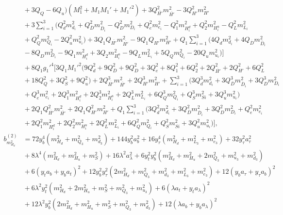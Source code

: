 \documentclass[preprint,amsmath,amssymb,aps,superscriptaddress,prd,showpacs,floatfix,nofootinbib]{revtex4-1}
\begin{document}
\begin{subequations}
\begin{align}
&{}+3Q_Q-6Q_u\big )\left ( M_1^2+M_1M_1'+M_1'^2\right )+3Q_{\overline{H'}}^2m_{\overline{H'}}^2-3Q_{H'}^2m_{H'}^2\nonumber\\
&{}+3\sum_{i=1}^3\big ( Q_d^2m_{d_i}^2+Q_{\overline{D}}^2m_{\overline{D}_i}^2-Q_D^2m_{D_i}^2+Q_e^2m_{e_i}^2-Q_1^2m_{H_i^d}^2+Q_2^2m_{H_i^u}^2-Q_L^2m_{L_i}^2\nonumber\\
&{}+Q_Q^2m_{Q_i}^2-2Q_u^2m_{u_i}^2\big )+3Q_1Q_{\overline{H'}}m_{\overline{H'}}^2-9Q_1Q_{H'}m_{H'}^2+Q_1\sum_{i=1}^3\bigg ( 4Q_dm_{d_i}^2+4Q_{\overline{D}}m_{\overline{D}_i}^2\nonumber\\
&{}-8Q_Dm_{D_i}^2-9Q_1m_{H_i^d}^2+3Q_2m_{H_i^u}^2-9Q_Lm_{L_i}^2+5Q_Qm_{Q_i}^2-20Q_um_{u_i}^2\big )\bigg ]\nonumber\\
&{}+8Q_1g_1'^4\bigg [ 3Q_1M_1'^2\big ( 9Q_d^2+9Q_{\overline{D}}^2+9Q_D^2+3Q_e^2+8Q_1^2+6Q_2^2+2Q_{\overline{H'}}^2+2Q_{H'}^2+6Q_L^2\nonumber\\
&{}+18Q_Q^2+3Q_S^2+9Q_u^2\big )+2Q_{\overline{H'}}^3m_{\overline{H'}}^2+2Q_{H'}^3m_{H'}^2+\sum_{i=1}^3\big ( 3Q_d^3m_{d_i}^2+3Q_{\overline{D}}^3m_{\overline{D}_i}^2+3Q_D^3m_{D_i}^2\nonumber\\
&{}+Q_e^3m_{e_i}^2+2Q_1^3m_{H_i^d}^2+2Q_2^3m_{H_i^u}^2+2Q_L^3m_{L_i}^2+6Q_Q^3m_{Q_i}^2+Q_S^3m_{Si}^2+3Q_u^3m_{u_i}^2\big )\nonumber\\
&{}+2Q_1Q_{\overline{H'}}^2m_{\overline{H'}}^2+2Q_1Q_{H'}^2m_{H'}^2+Q_1\sum_{i=1}^3\big ( 3Q_d^2m_{d_i}^2+3Q_{\overline{D}}^2m_{\overline{D}_i}^2+3Q_D^2m_{D_i}^2+Q_e^2m_{e_i}^2\nonumber\\
&{}+2Q_1^2m_{H_i^d}^2+2Q_2^2m_{H_i^u}^2+2Q_L^2m_{L_i}^2+6Q_Q^2m_{Q_i}^2+Q_S^2m_{Si}^2+3Q_u^2m_{u_i}^2\big )\bigg ],\label{eq:USSMmHd2BetaTwoLoop}\\
b_{m_{H_d}^2}^{(2)}&=72y_b^4\left ( m_{H_d}^2+m_{Q_3}^2+m_{d_3}^2\right )+144y_b^2a_b^2+16y_\tau^4\left ( m_{H_d}^2+m_{L_3}^2+m_{e_3}^2\right )+32y_\tau^2 a_\tau^2\nonumber\\
&{}+8\lambda^4\left ( m_{H_d}^2+m_{H_u}^2+m_S^2\right )+16\lambda^2 a_\lambda^2+6y_t^2y_b^2\left ( m_{H_d}^2+m_{H_u}^2+2m_{Q_3}^2+m_{u_3}^2+m_{d_3}^2\right )\nonumber\\
&{}+6\left ( y_t a_b+y_b a_t\right )^2+12y_b^2y_\tau^2\left ( 2m_{H_d}^2+m_{Q_3}^2+m_{d_3}^2+m_{L_3}^2+m_{e_3}^2\right )+12\left ( y_b a_\tau + y_\tau a_b\right )^2\nonumber\\
&{}+6\lambda^2y_t^2\left ( m_{H_d}^2+2m_{H_u}^2+m_S^2+m_{Q_3}^2+m_{u_3}^2\right )+6\left ( \lambda a_t+y_ta_\lambda\right )^2\nonumber\\
&{}+12\lambda^2y_b^2\left ( 2m_{H_d}^2+m_{H_u}^2+m_S^2+m_{Q_3}^2+m_{d_3}^2\right )+12\left ( \lambda a_b+y_b a_\lambda\right )^2\nonumber\\

\end{align}
\end{subequations}
\end{document}
